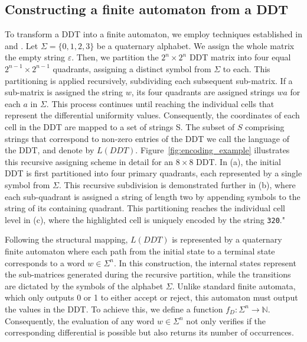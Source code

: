 \subsection{Constructing a finite automaton from a DDT}

To transform a DDT into a finite automaton, we employ techniques established in \cite{BerstelAndMorcrette} and \cite{BerstelAndNaitAbdallah}. Let $\Sigma = \{0, 1, 2, 3\}$ be a quaternary alphabet. We assign the whole matrix the empty string $\varepsilon$. Then, we partition the $2^{n} \times 2^{n}$ DDT matrix into four equal $2^{n - 1} \times 2^{n - 1}$ quadrants, assigning a distinct symbol from $\Sigma$ to each. This partitioning is applied recursively, subdividing each subsequent sub-matrix. If a sub-matrix is assigned the string $w$, its four quadrants are assigned strings $wa$ for each $a$ in $\Sigma$. This process continues until reaching the individual cells that represent the differential uniformity values. Consequently, the coordinates of each cell in the DDT are mapped to a set of strings S. The subset of $S$ comprising strings that correspond to non-zero entries of the DDT we call the language of the DDT, and denote by $L(DDT)$. Figure~\ref{fig:encoding_example} illustrates this recursive assigning scheme in detail for an $8 \times 8$ DDT. In (a), the initial DDT is first partitioned into four primary quadrants, each represented by a single symbol from $\Sigma$. This recursive subdivision is demonstrated further in (b), where each sub-quadrant is assigned a string of length two by appending symbols to the string of its containing quadrant. This partitioning reaches the individual cell level in (c), where the highlighted cell is uniquely encoded by the string \texttt{320}."



Following the structural mapping, $L(DDT)$ is represented by a quaternary finite automaton where each path from the initial state to a terminal state corresponds to a word $w \in \Sigma^{n}$. In this construction, the internal states represent the sub-matrices generated during the recursive partition, while the transitions are dictated by the symbols of the alphabet $\Sigma$. Unlike standard finite automata, which only outputs 0 or 1 to either accept or reject, this automaton must output the values in the DDT. To achieve this, we define a function $f_{D} : \Sigma^{n} \to \mathbb{N}$. Consequently, the evaluation of any word $w \in \Sigma^{n}$ not only verifies if the corresponding differential is possible but also returns its number of occurrences.

